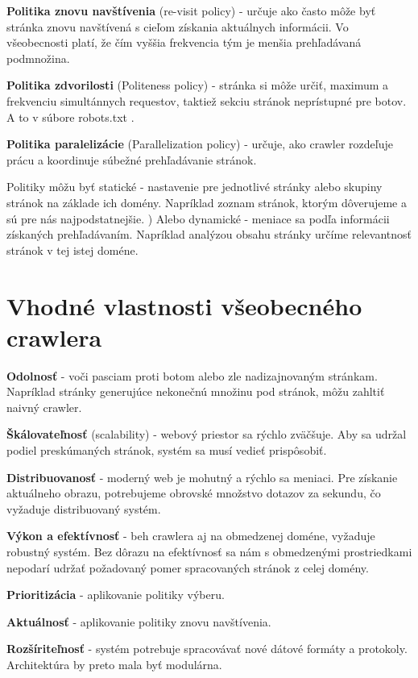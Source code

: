 \textbf{Politika znovu navštívenia} (re-visit policy) - určuje ako často môže byť stránka znovu navštívená s cieľom získania aktuálnych informácii. Vo všeobecnosti platí, že čím vyššia frekvencia tým je menšia prehľadávaná podmnožina. 

\textbf{Politika zdvorilosti} (Politeness policy) - stránka si môže určiť, maximum a frekvenciu simultánnych requestov, taktiež sekciu stránok neprístupné pre botov. A to v súbore robots.txt \cite{robotsTxt}. 

\textbf{Politika paralelizácie} (Parallelization policy) - určuje, ako crawler rozdeľuje prácu a koordinuje súbežné prehľadávanie stránok. 

Politiky môžu byť statické - nastavenie pre jednotlivé stránky alebo skupiny stránok na základe ich domény. Napríklad zoznam stránok, ktorým dôverujeme a sú pre nás najpodstatnejšie. )
Alebo dynamické - meniace sa podľa informácii získaných prehľadávaním. Napríklad analýzou obsahu stránky určíme relevantnosť stránok v tej istej doméne. 




\section{Vhodné vlastnosti všeobecného crawlera}

\textbf{Odolnosť} - voči pasciam proti botom alebo zle nadizajnovaným stránkam. Napríklad stránky generujúce nekonečnú množinu pod stránok, môžu zahltiť naivný crawler. 

\textbf{Škálovateľnosť} (scalability) - webový priestor sa rýchlo zväčšuje. Aby sa udržal podiel preskúmaných stránok, systém sa musí 
vedieť prispôsobiť. 

\textbf{Distribuovanosť} -  moderný web je mohutný a rýchlo sa meniaci. Pre získanie aktuálneho obrazu, potrebujeme obrovské množstvo dotazov za sekundu, čo vyžaduje distribuovaný systém. 

\textbf{Výkon a efektívnosť} - beh crawlera aj na obmedzenej doméne, vyžaduje robustný systém. Bez dôrazu na efektívnosť sa nám s obmedzenými prostriedkami nepodarí udržať požadovaný pomer spracovaných stránok z celej domény.

\textbf{Prioritizácia} - aplikovanie politiky výberu.

\textbf{Aktuálnosť} - aplikovanie politiky znovu navštívenia.

\textbf{Rozšíriteľnosť} - systém potrebuje spracovávať nové dátové formáty a protokoly. Architektúra by preto mala byť modulárna. 

